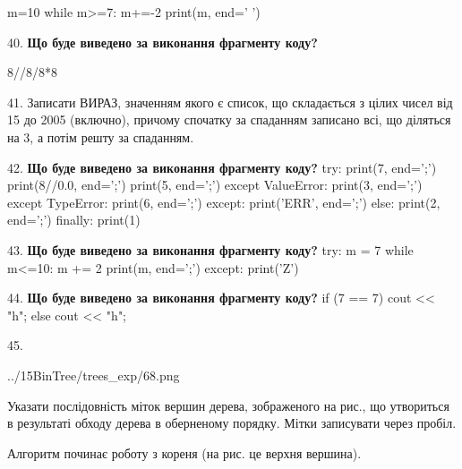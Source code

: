 \documentclass[11pt]{article}
\begin{document}
m=10
while m>=7:
    m+=-2
print(m, end=' ')

\par\vspace{5mm}

40. \textbf{Що буде виведено за виконання фрагменту коду?}

8//8/8*8
\par\vspace{5mm}

41. 
Записати ВИРАЗ, значенням якого є список, що складається з цілих чисел від 15 до 2005 (включно), причому спочатку за спаданням записано всі, що діляться на 3, а потім решту за спаданням.\par\vspace{5mm}

42. \textbf{Що буде виведено за виконання фрагменту коду?}
try:
    print(7, end=';')
    print(8//0.0, end=';')
    print(5, end=';')
except ValueError:
    print(3, end=';')
except TypeError:
    print(6, end=';')
except:
    print('ERR', end=';')
else:
    print(2, end=';')
finally:
    print(1)
\par\vspace{5mm}

43. \textbf{Що буде виведено за виконання фрагменту коду?}
try:
    m = 7
    while m<=10:
        m += 2
    print(m, end=';')
except:
    print('Z')
\par\vspace{5mm}

44. \textbf{Що буде виведено за виконання фрагменту коду?}
if (7 == 7)
    cout << "h";
else
    cout << "h";

\par\vspace{5mm}

45. 

\begin{center}
	{../15BinTree/trees_exp/68.png}
\end{center}
Указати послідовність міток вершин дерева, зображеного на рис., що утвориться в результаті обходу дерева в оберненому порядку. Мітки записувати через пробіл.\par Алгоритм починає роботу з кореня (на рис. це верхня вершина).
\par\vspace{5mm}
\end{document}
